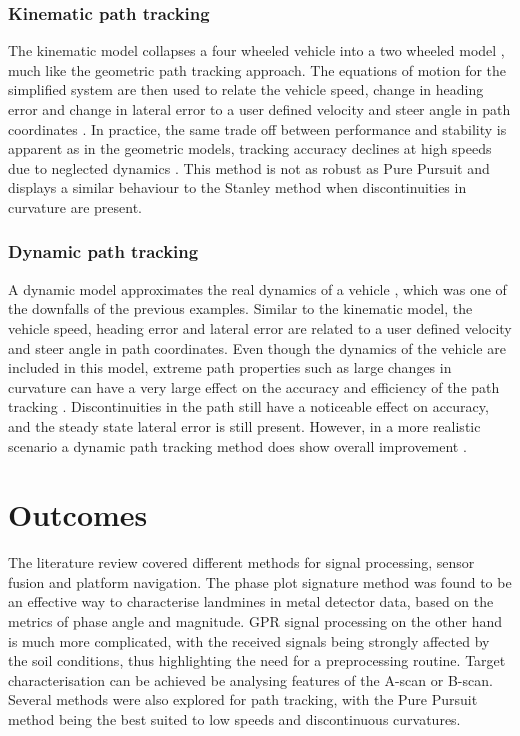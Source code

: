 \documentclass[main.tex]{subfiles}
\begin{document}
\subsubsection{Kinematic path tracking}
The kinematic model collapses a four wheeled vehicle into a two wheeled model \parencite{snider2009}, much like the geometric path tracking approach. The equations of motion for the simplified system are then used to relate the vehicle speed, change in heading error and change in lateral error to a user defined velocity and steer angle in path coordinates \parencite{Gilbert2003}. In practice, the same trade off between performance and stability is apparent as in the geometric models, tracking accuracy declines at high speeds due to neglected dynamics \parencite{snider2009}. This method is not as robust as Pure Pursuit and displays a similar behaviour to the Stanley method when discontinuities in curvature are present.

\subsubsection{Dynamic path tracking}
A dynamic model approximates the real dynamics of a vehicle \parencite{Gilbert2003}, which was one of the downfalls of the previous examples. Similar to the kinematic model, the vehicle speed, heading error and lateral error are related to a user defined velocity and steer angle in path coordinates. Even though the dynamics of the vehicle are included in this model, extreme path properties such as large changes in curvature can have a very large effect on the accuracy and efficiency of the path tracking \parencite{snider2009}. Discontinuities in the path still have a noticeable effect on accuracy, and the steady state lateral error is still present. However, in a more realistic scenario a dynamic path tracking method does show overall improvement \parencite{Lundgren2003}.

\section{Outcomes}
The literature review covered different methods for signal processing, sensor fusion and platform navigation. The phase plot signature method was found to be an effective way to characterise landmines in metal detector data, based on the metrics of phase angle and magnitude. GPR signal processing on the other hand is much more complicated, with the received signals being strongly affected by the soil conditions, thus highlighting the need for a preprocessing routine. Target characterisation can be achieved be analysing features of the A-scan or B-scan. Several methods were also explored for path tracking, with the Pure Pursuit method being the best suited to low speeds and discontinuous curvatures.
\end{document}
